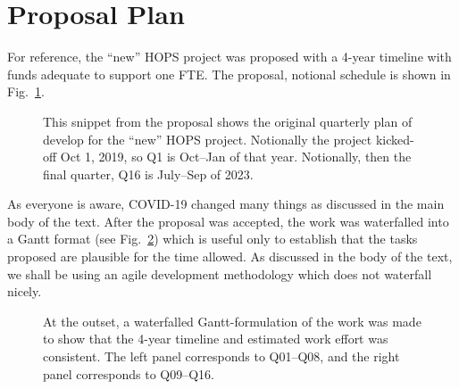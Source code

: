 %
%
\section{Proposal Plan}
\label{sec:prop-plan}

For reference, the ``new'' HOPS project was proposed with
a 4-year timeline with funds adequate to support one FTE.
The proposal, notional schedule is shown in
Fig.~\ref{fig:prop-quarterly}.
\begin{figure}[!h]
\caption[Proposed Quarterly Plan]{%
This snippet from the proposal shows the original quarterly
plan of develop for the ``new'' HOPS project.  Notionally the
project kicked-off Oct 1, 2019, so Q1 is Oct--Jan of that
year.  Notionally, then the final quarter, Q16 is July--Sep
of 2023.  }
\label{fig:prop-quarterly}
\end{figure}
As everyone is aware, COVID-19 changed many things as discussed
in the main body of the text.  After the proposal was accepted,
the work was waterfalled into a Gantt format
(see Fig.~\ref{fig:ganttcrap}) which is useful only
to establish that the tasks proposed are plausible for the time
allowed.  As discussed in the body of the text, we shall be using
an agile development methodology which does not waterfall nicely.
\begin{figure}[!h]
\caption[Initial Gantt Timeline]{%
At the outset, a waterfalled Gantt-formulation of the work was
made to show that the 4-year timeline and estimated work effort
was consistent. The left panel corresponds to Q01--Q08, and the
right panel corresponds to Q09--Q16.}
\label{fig:ganttcrap}
\end{figure}

%
%
